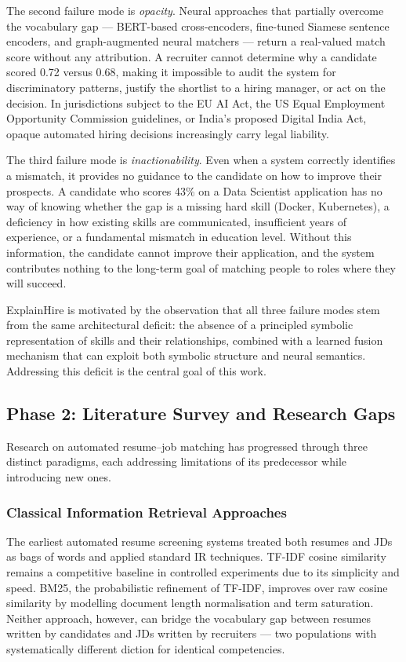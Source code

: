 \documentclass[conference]{IEEEtran}
\begin{document}
The second failure mode is \textit{opacity}. Neural approaches that partially
overcome the vocabulary gap --- BERT-based cross-encoders, fine-tuned Siamese
sentence encoders, and graph-augmented neural matchers --- return a
real-valued match score without any attribution. A recruiter cannot determine
why a candidate scored 0.72 versus 0.68, making it impossible to audit the
system for discriminatory patterns, justify the shortlist to a hiring manager,
or act on the decision. In jurisdictions subject to the EU AI Act, the US
Equal Employment Opportunity Commission guidelines, or India's proposed
Digital India Act, opaque automated hiring decisions increasingly carry
legal liability.

The third failure mode is \textit{inactionability}. Even when a system
correctly identifies a mismatch, it provides no guidance to the candidate
on how to improve their prospects. A candidate who scores 43\% on a
Data Scientist application has no way of knowing whether the gap is a missing
hard skill (Docker, Kubernetes), a deficiency in how existing skills are
communicated, insufficient years of experience, or a fundamental mismatch in
education level. Without this information, the candidate cannot improve their
application, and the system contributes nothing to the long-term goal of
matching people to roles where they will succeed.

ExplainHire is motivated by the observation that all three failure modes stem
from the same architectural deficit: the absence of a principled symbolic
representation of skills and their relationships, combined with a learned
fusion mechanism that can exploit both symbolic structure and neural
semantics. Addressing this deficit is the central goal of this work.

\subsection{Phase 2: Literature Survey and Research Gaps}

Research on automated resume--job matching has progressed through three
distinct paradigms, each addressing limitations of its predecessor while
introducing new ones.

\subsubsection{Classical Information Retrieval Approaches}
The earliest automated resume screening systems treated both resumes and JDs
as bags of words and applied standard IR techniques. TF-IDF cosine similarity
remains a competitive baseline in controlled experiments due to its
simplicity and speed. BM25, the probabilistic refinement of TF-IDF, improves
over raw cosine similarity by modelling document length normalisation and
term saturation. Neither approach, however, can bridge the vocabulary gap
between resumes written by candidates and JDs written by recruiters --- two
populations with systematically different diction for identical competencies.
\end{document}
